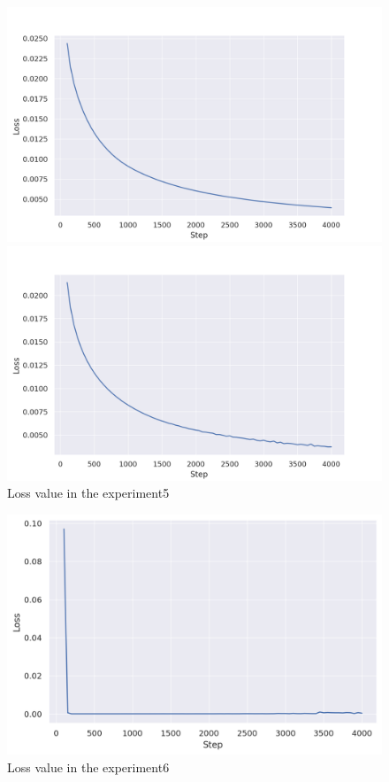 \begin{figure}[h]
  \begin{minipage}[b]{0.45\linewidth}
    \centering
    \includegraphics[keepaspectratio, scale=0.33]{images/mazemaze_1.png}
    \subcaption{}
  \end{minipage}
  \begin{minipage}[b]{0.45\linewidth}
    \centering
    \includegraphics[keepaspectratio, scale=0.33]{images/mazemaze_8.png}
    \subcaption{}
  \end{minipage}
\caption{Loss value in the experiment5}
\label{Fig:loss5}
\end{figure}

\begin{figure}[h]
  \centering
  \includegraphics[keepaspectratio, scale=0.33]{images/9cam_19.png}
  \caption{Loss value in the experiment6}
  \label{Fig:loss6}
\end{figure}

